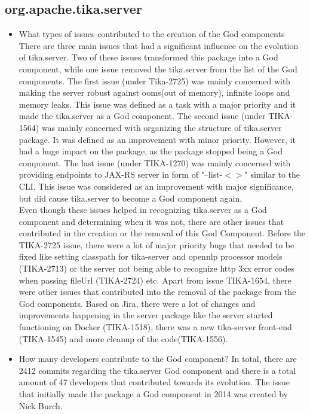 \documentclass{article}
\begin{document}

\subsection{org.apache.tika.server}
\begin{itemize}
    \item What types of issues contributed to the creation of the God components\\
    There are three main issues that had a significant influence on the evolution of tika.server. Two of these issues transformed this package into a God component, while one issue removed the tika.server from the list of the God components. The first issue (under Tika-2725) was mainly concerned with making the server robust against ooms(out of memory), infinite loops and memory leaks. This issue was defined as a task with a major priority and it made the tika.server as a God component. The second issue (under TIKA-1564) was mainly concerned with organizing the structure of tika.server package. It was defined as an improvement with minor priority. However, it had a huge impact on the package, as the package stopped being a God component. The last issue (under TIKA-1270) was mainly concerned with providing endpoints to JAX-RS server in form of "--list-$<>$" similar to the CLI. This issue was considered as an improvement with major significance, but did cause tika.server to become a God component again.\\
    Even though these issues helped in recognizing tika.server as a God component and determining when it was not, there are other issues that contributed in the creation or the removal of this God Component. Before the TIKA-2725 issue, there were a lot of major priority bugs that needed to be fixed like setting classpath for tika-server and opennlp processor models (TIKA-2713) or the server not being able to recognize http 3xx error codes when passing fileUrl (TIKA-2724) etc. Apart from issue TIKA-1654, there were other issues that contributed into the removal of the package from the God components. Based on Jira, there were a lot of changes and improvements happening in the server package like the server started functioning on Docker (TIKA-1518), there was a new tika-server front-end (TIKA-1545) and more cleanup of the code(TIKA-1556).
    \item How many developers contribute to the God component?
    In total, there are 2412 commits regarding the tika.server God component and there is a total amount of 47 developers that contributed towards its evolution. The issue that initially made the package a God component in 2014 was created by Nick Burch. %

\end{itemize}
\end{document}
